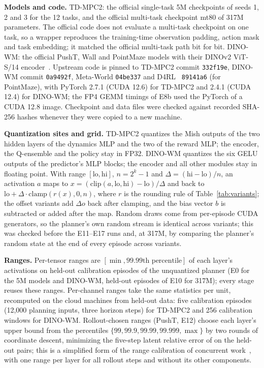 \textbf{Models and code.} TD-MPC2: the official single-task 5M checkpoints of seeds 1, 2 and 3 for the 12 tasks, and the official multi-task checkpoint mt80 of 317M parameters. The official code does not evaluate a multi-task checkpoint on one task, so a wrapper reproduces the training-time observation padding, action mask and task embedding; it matched the official multi-task path bit for bit. DINO-WM: the official PushT, Wall and PointMaze models with their DINOv2 ViT-S/14 encoder~\citep{oquab2024dinov2}. Upstream code is pinned to TD-MPC2 commit \texttt{332f19e}, DINO-WM commit \texttt{0a9492f}, Meta-World \texttt{04be337} and D4RL~\citep{fu2020d4rl} \texttt{89141a6} (for PointMaze), with PyTorch 2.7.1 (CUDA 12.6) for TD-MPC2 and 2.4.1 (CUDA 12.4) for DINO-WM; the FP4 GEMM timings of E8b used the PyTorch of a CUDA 12.8 image. Checkpoint and data files were checked against recorded SHA-256 hashes whenever they were copied to a new machine.

\textbf{Quantization sites and grid.} TD-MPC2 quantizes the Mish outputs of the two hidden layers of the dynamics MLP and the two of the reward MLP; the encoder, the Q-ensemble and the policy stay in FP32. DINO-WM quantizes the six GELU outputs of the predictor's MLP blocks; the encoder and all other modules stay in floating point. With range $[\mathrm{lo},\mathrm{hi}]$, $n=2^k-1$ and $\Delta=(\mathrm{hi}-\mathrm{lo})/n$, an activation $a$ maps to $x=(\mathrm{clip}(a,\mathrm{lo},\mathrm{hi})-\mathrm{lo})/\Delta$ and back to $\mathrm{lo}+\Delta\cdot\mathrm{clamp}(r(x),0,n)$, where $r$ is the rounding rule of Table~\ref{tab:variants}; the offset variants add $\Delta o$ back after clamping, and the bias vector $b$ is subtracted or added after the map. Random draws come from per-episode CUDA generators, so the planner's own random stream is identical across variants; this was checked before the E11--E17 runs and, at 317M, by comparing the planner's random state at the end of every episode across variants.

\textbf{Ranges.} Per-tensor ranges are $[\min, \text{99.99th percentile}]$ of each layer's activations on held-out calibration episodes of the unquantized planner (E0 for the 5M models and DINO-WM, held-out episodes of E10 for 317M); every stage reuses these ranges. Per-channel ranges take the same statistics per unit, recomputed on the cloud machines from held-out data: five calibration episodes (12{,}000 planning inputs, three horizon steps) for TD-MPC2 and 256 calibration windows for DINO-WM. Rollout-chosen ranges (PushT, E12) choose each layer's upper bound from the percentiles $\{99, 99.9, 99.99, 99.999, \max\}$ by two rounds of coordinate descent, minimizing the five-step latent relative error of \dtm on the held-out pairs; this is a simplified form of the range calibration of concurrent work~\citep{wmquant2026}, with one range per layer for all rollout steps and without its other components.

